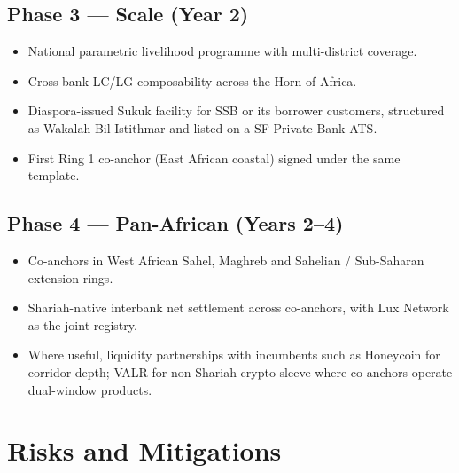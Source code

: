 \documentclass[11pt,letterpaper]{article}
\begin{document}
\subsection{Phase 3 --- Scale (Year 2)}
\begin{itemize}[leftmargin=1.6em]
  \item National parametric livelihood programme with multi-district
        coverage.
  \item Cross-bank LC/LG composability across the Horn of Africa.
  \item Diaspora-issued Sukuk facility for SSB or its borrower
        customers, structured as Wakalah-Bil-Istithmar and listed on a
        SF Private Bank ATS.
  \item First Ring 1 co-anchor (East African coastal) signed under
        the same template.
\end{itemize}

\subsection{Phase 4 --- Pan-African (Years 2--4)}
\begin{itemize}[leftmargin=1.6em]
  \item Co-anchors in West African Sahel, Maghreb and Sahelian /
        Sub-Saharan extension rings.
  \item Shariah-native interbank net settlement across co-anchors,
        with Lux Network as the joint registry.
  \item Where useful, liquidity partnerships with incumbents such as
        Honeycoin for corridor depth; VALR for non-Shariah crypto
        sleeve where co-anchors operate dual-window products.
\end{itemize}

\section{Risks and Mitigations}
\end{document}
